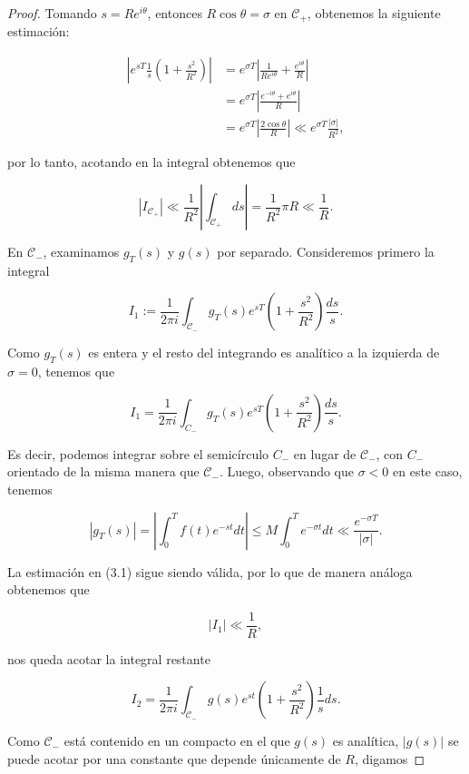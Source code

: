 \begin{proof}
Tomando $s = R e^{i \theta}$, entonces $R \cos \theta = \sigma$ en $\mathscr{C}_{+}$, obtenemos la siguiente estimación:

\begin{equation}
    \begin{aligned}
    \left|e^{s T} \frac{1}{s}\left(1+\frac{s^2}{R^2}\right)\right| &= e^{\sigma T}\left|\frac{1}{R e^{i \theta}}+\frac{e^{i \theta}}{R}\right|\\
    &=e^{\sigma T}\left|\frac{e^{-i\theta}+e^{i\theta}}{R}\right|\\
    &=e^{\sigma T}\left|\frac{2 \cos \theta}{R}\right| \ll e^{\sigma T} \frac{|\sigma|}{R^2},
\end{aligned}
\end{equation}

por lo tanto, acotando en la integral obtenemos que

\[
\left|I_{\mathscr{C}_{+}}\right| \ll \frac{1}{R^2}\left|\int_{\mathscr{C}_{+}} d s\right|=\frac{1}{R^2}\pi R\ll \frac{1}{R}.
\]

En $\mathscr{C}_{-}$, examinamos $g_T(s)$ y $g(s)$ por separado. Consideremos primero la integral

\[
I_1 := \frac{1}{2 \pi i} \int_{\mathscr{C}_{-}} g_T(s) e^{s T}\left(1+\frac{s^2}{R^2}\right) \frac{d s}{s}.
\]

Como $g_T(s)$ es entera y el resto del integrando es analítico a la izquierda de $\sigma = 0$, tenemos que

\[
I_1 = \frac{1}{2 \pi i} \int_{C_{-}} g_T(s) e^{s T}\left(1+\frac{s^2}{R^2}\right) \frac{d s}{s}.
\] 

Es decir, podemos integrar sobre el semicírculo \( C_{-} \) en lugar de \( \mathscr{C}_{-} \), con \( C_{-} \) orientado de la misma manera que \( \mathscr{C}_{-} \). Luego, observando que \( \sigma < 0 \) en este caso, tenemos  

\[
\left|g_T(s)\right| = \left|\int_0^T f(t) e^{-s t} d t\right| \leq M \int_0^T e^{-\sigma t} d t \ll \frac{e^{-\sigma T}}{|\sigma|}.
\]

La estimación en (3.1) sigue siendo válida, por lo que de manera análoga obtenemos que

$$|I_{1}|\ll \frac{1}{R},$$

nos queda acotar la integral restante

$$I_2=\frac{1}{2\pi i }\int_{\mathscr{C}_-}g(s)e^{st}\left(1+\frac{s^2}{R^2}\right)\frac{1}{s}ds.$$

Como $\mathscr{C}_-$ está contenido en un compacto en el que $g(s)$ es analítica, $|g(s)|$ se puede acotar por una constante que depende únicamente de $R$, digamos 


\end{proof}
